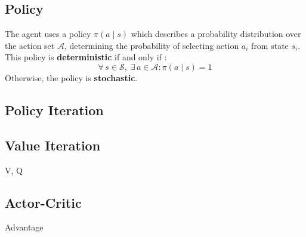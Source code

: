 \subsection{Policy}
The agent uses a policy $\pi(a \mid s)$ which describes a probability
distribution over the action set $\mathcal{A}$, determining the probability of
selecting action $a_i$ from state $s_i$. This policy is 
\textbf{deterministic} if and only if :
\begin{equation}
\forall\, s \in \mathcal{S},\; \exists\, a \in \mathcal{A} : \pi(a \mid s) = 1
\end{equation}
\noindent Otherwise, the policy is \textbf{stochastic}.


\subsection{Policy Iteration}

\subsection{Value Iteration}
V, Q

\subsection{Actor-Critic}


Advantage

